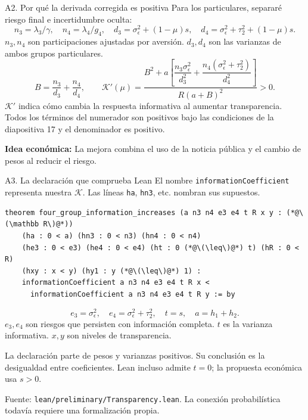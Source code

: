 \documentclass[aspectratio=169,11pt]{beamer}
\newcommand{\idea}[1]{\par\medskip\textbf{Idea económica:} #1}
\begin{document}
\begin{frame}{A2. Por qué la derivada corregida es positiva}
 \small
 Para los particulares, separaré riesgo final e incertidumbre oculta:
 \[
  n_3=\lambda_3/\gamma,\quad n_4=\lambda_4/g_4,\quad
  d_3=\sigma_\epsilon^2+(1-\mu)s,\quad
  d_4=\sigma_\epsilon^2+\tau_2^2+(1-\mu)s.
 \]
 \(n_3,n_4\) son participaciones ajustadas por aversión.
 \(d_3,d_4\) son las varianzas de ambos grupos particulares.
 \[
  B=\frac{n_3}{d_3}+\frac{n_4}{d_4},\qquad
  \mathcal K'(\mu)=
  \frac{B^2+a\left[\dfrac{n_3\sigma_\epsilon^2}{d_3^2}
                  +\dfrac{n_4(\sigma_\epsilon^2+\tau_2^2)}{d_4^2}\right]}
       {R(a+B)^2}>0.
 \]
 \normalsize
 \(\mathcal K'\) indica cómo cambia la respuesta informativa al aumentar
 transparencia. Todos los términos del numerador son positivos bajo
 las condiciones de la diapositiva 17 y el denominador es positivo.
 \idea{La mejora combina el uso de la noticia pública y el cambio de pesos al reducir el riesgo.}
\end{frame}
\begin{frame}[fragile]{A3. La declaración que comprueba Lean}
 \small
 El nombre \texttt{informationCoefficient} representa nuestra \(\mathcal K\).
 Las líneas \texttt{ha}, \texttt{hn3}, etc. nombran sus supuestos.
 \begin{lstlisting}
theorem four_group_information_increases (a n3 n4 e3 e4 t R x y : (*@\(\mathbb R\)@*))
    (ha : 0 < a) (hn3 : 0 < n3) (hn4 : 0 < n4)
    (he3 : 0 < e3) (he4 : 0 < e4) (ht : 0 (*@\(\leq\)@*) t) (hR : 0 < R)
    (hxy : x < y) (hy1 : y (*@\(\leq\)@*) 1) :
    informationCoefficient a n3 n4 e3 e4 t R x <
      informationCoefficient a n3 n4 e3 e4 t R y := by
 \end{lstlisting}
 \[
  e_3=\sigma_\epsilon^2,\quad
  e_4=\sigma_\epsilon^2+\tau_2^2,\quad t=s,\quad a=h_1+h_2.
 \]
 \(e_3,e_4\) son riesgos que persisten con información completa.
 \(t\) es la varianza informativa. \(x,y\) son niveles de transparencia.
 \medskip
 \par La declaración parte de pesos y varianzas positivos.
 Su conclusión es la desigualdad entre coeficientes.
 Lean incluso admite \(t=0\); la propuesta económica usa \(s>0\).
 \small\medskip\par
 Fuente: \texttt{lean/preliminary/Transparency.lean}.
 La conexión probabilística todavía requiere una formalización propia.
\end{frame}
\end{document}
